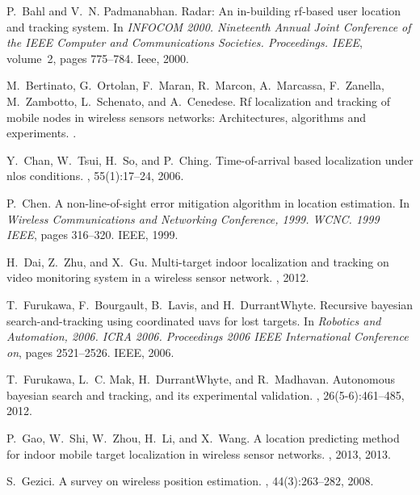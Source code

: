 \begin{thebibliography}{40}

P.~Bahl and V.~N. Padmanabhan.
\newblock Radar: An in-building rf-based user location and tracking system.
\newblock In {\em INFOCOM 2000. Nineteenth Annual Joint Conference of the IEEE
  Computer and Communications Societies. Proceedings. IEEE}, volume~2, pages
  775--784. Ieee, 2000.

M.~Bertinato, G.~Ortolan, F.~Maran, R.~Marcon, A.~Marcassa, F.~Zanella,
  M.~Zambotto, L.~Schenato, and A.~Cenedese.
\newblock Rf localization and tracking of mobile nodes in wireless sensors
  networks: Architectures, algorithms and experiments.
.

Y.~Chan, W.~Tsui, H.~So, and P.~Ching.
\newblock Time-of-arrival based localization under nlos conditions.
, 55(1):17--24, 2006.

P.~Chen.
\newblock A non-line-of-sight error mitigation algorithm in location
  estimation.
\newblock In {\em Wireless Communications and Networking Conference, 1999.
  WCNC. 1999 IEEE}, pages 316--320. IEEE, 1999.

H.~Dai, Z.~Zhu, and X.~Gu.
\newblock Multi-target indoor localization and tracking on video monitoring
  system in a wireless sensor network.
, 2012.

T.~Furukawa, F.~Bourgault, B.~Lavis, and H.~Durrant{\-}Whyte.
\newblock Recursive bayesian search-and-tracking using coordinated uavs for
  lost targets.
\newblock In {\em Robotics and Automation, 2006. ICRA 2006. Proceedings 2006
  IEEE International Conference on}, pages 2521--2526. IEEE, 2006.

T.~Furukawa, L.~C. Mak, H.~Durrant{\-}Whyte, and R.~Madhavan.
\newblock Autonomous bayesian search and tracking, and its experimental
  validation.
, 26(5-6):461--485, 2012.

P.~Gao, W.~Shi, W.~Zhou, H.~Li, and X.~Wang.
\newblock A location predicting method for indoor mobile target localization in
  wireless sensor networks.
, 2013,
  2013.

S.~Gezici.
\newblock A survey on wireless position estimation.
, 44(3):263--282, 2008.


\end{thebibliography}

